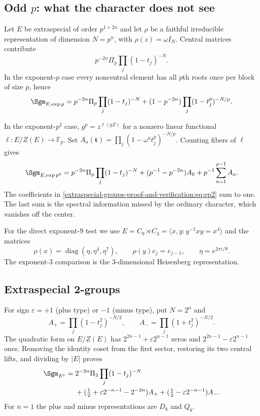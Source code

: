 \documentclass[10pt]{article}
\begin{document}
\subsection{Odd $p$: what the character does not see}
Let $E$ be extraspecial of order $p^{1+2n}$ and let $\rho$ be a faithful
irreducible representation of dimension $N=p^n$, with
$\rho(z)=\omega I_N$.  Central matrices contribute
\[
p^{-2n}\Pi_p\prod_j(1-t_j)^{-N}.
\]
In the exponent-$p$ case every noncentral element has all $p$th roots once
per block of size $p$, hence
\begin{equation}\label{extraspecial-groups-proof-and-verification:eq:ep}
\Sgm_{E,\exp p}=p^{-2n}\Pi_p\prod_j(1-t_j)^{-N}
+(1-p^{-2n})\prod_j(1-t_j^p)^{-N/p}.
\end{equation}

In the exponent-$p^2$ case, $g^p=z^{\ell(gZ)}$ for a nonzero linear
functional $\ell:E/Z(E)\to\mathbb F_p$.  Set
$A_a(\mathbf t)=\prod_j(1-\omega^at_j^p)^{-N/p}$.  Counting fibers of
$\ell$ gives
\begin{equation}\label{extraspecial-groups-proof-and-verification:eq:ep2}
\Sgm_{E,\exp p^2}=p^{-2n}\Pi_p\prod_j(1-t_j)^{-N}
+(p^{-1}-p^{-2n})A_0+p^{-1}\sum_{a=1}^{p-1}A_a.
\end{equation}
The coefficients in \eqref{extraspecial-groups-proof-and-verification:eq:ep2} sum to one.  The last sum is the spectral
information missed by the ordinary character, which vanishes off the center.

For the direct exponent-$9$ test we use
$E=C_9\rtimes C_3=\langle x,y:y^{-1}xy=x^4\rangle$ and the matrices
\[
\rho(x)=\operatorname{diag}(\eta,\eta^4,\eta^7),\qquad
\rho(y)e_j=e_{j-1},\qquad \eta=e^{2\pi i/9}.
\]
The exponent-$3$ comparison is the $3$-dimensional Heisenberg representation.

\subsection{Extraspecial 2-groups}
For sign $\varepsilon=+1$ (plus type) or $-1$ (minus type), put $N=2^n$ and
\[
A_+=\prod_j(1-t_j^2)^{-N/2},\qquad
A_-=\prod_j(1+t_j^2)^{-N/2}.
\]
The quadratic form on $E/Z(E)$ has
$2^{2n-1}+\varepsilon2^{n-1}$ zeros and
$2^{2n-1}-\varepsilon2^{n-1}$ ones.  Removing the identity coset from the
first sector, restoring its two central lifts, and dividing by $|E|$ proves
\begin{align}\label{extraspecial-groups-proof-and-verification:eq:e2}
\Sgm_{E^\varepsilon}={}&2^{-2n}\Pi_2\prod_j(1-t_j)^{-N}\notag\\
&+(\tfrac12+\varepsilon2^{-n-1}-2^{-2n})A_+
+(\tfrac12-\varepsilon2^{-n-1})A_-.
\end{align}
For $n=1$ the plus and minus representations are $D_8$ and $Q_8$.
\end{document}
